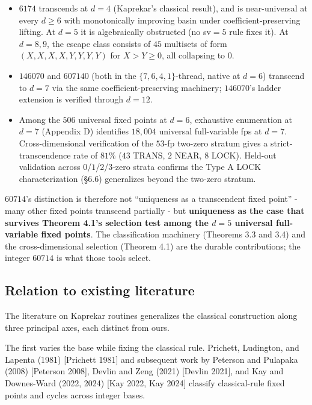 \documentclass[11pt,letterpaper]{article}
\providecommand{\tightlist}{%
  \setlength{\itemsep}{0pt}\setlength{\parskip}{0pt}}
\theoremstyle{paperstyle}
\theoremstyle{paperstyledef}
\theoremstyle{paperstylerem}
\begin{document}
\begin{itemize}
\tightlist
\item
  \(6174\) transcends at \(d = 4\) (Kaprekar's classical result), and is
  near-universal at every \(d \geq 6\) with monotonically improving
  basin under coefficient-preserving lifting. At \(d = 5\) it is
  algebraically obstructed (no sv\(=5\) rule fixes it). At \(d = 8, 9\),
  the escape class consists of \(45\) multisets of form
  \((X, X, X, X, Y, Y, Y, Y)\) for \(X > Y \geq 0\), all collapsing to
  \(0\).
\item
  \(146070\) and \(607140\) (both in the \(\{7, 6, 4, 1\}\)-thread,
  native at \(d = 6\)) transcend to \(d = 7\) via the same
  coefficient-preserving machinery; \(146070\)'s ladder extension is
  verified through \(d = 12\).
\item
  Among the \(506\) universal fixed points at \(d = 6\), exhaustive
  enumeration at \(d = 7\) (Appendix D) identifies \(18{,}004\)
  universal full-variable fps at \(d = 7\). Cross-dimensional
  verification of the \(53\)-fp two-zero stratum gives a
  strict-transcendence rate of \(81\%\) (\(43\) TRANS, \(2\) NEAR, \(8\)
  LOCK). Held-out validation across \(0\)/\(1\)/\(2\)/\(3\)-zero strata
  confirms the Type A LOCK characterization (§6.6) generalizes beyond
  the two-zero stratum.
\end{itemize}

\(60714\)'s distinction is therefore not ``uniqueness as a transcendent
fixed point'' - many other fixed points transcend partially - but
\textbf{uniqueness as the case that survives Theorem 4.1's selection
test among the \(d = 5\) universal full-variable fixed points}. The
classification machinery (Theorems 3.3 and 3.4) and the
cross-dimensional selection (Theorem 4.1) are the durable contributions;
the integer \(60714\) is what those tools select.

\hypertarget{relation-to-existing-literature}{%
\subsection{Relation to existing literature}\label{relation-to-existing-literature}}

The literature on Kaprekar routines generalizes the classical
construction along three principal axes, each distinct from ours.

The first varies the base while fixing the classical rule. Prichett,
Ludington, and Lapenta (1981) {[}Prichett 1981{]} and subsequent work by
Peterson and Pulapaka (2008) {[}Peterson 2008{]}, Devlin and Zeng (2021)
{[}Devlin 2021{]}, and Kay and Downes-Ward (2022, 2024) {[}Kay 2022, Kay
2024{]} classify classical-rule fixed points and cycles across integer
bases.
\end{document}
